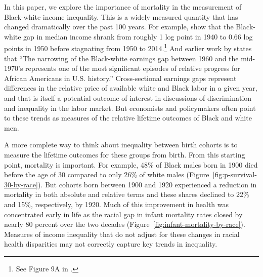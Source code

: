 \documentclass[12pt]{article}
\begin{document}

In this paper, we explore the importance of mortality in the measurement of Black-white income inequality. 
This is a widely measured quantity that has changed dramatically over the past 100 years. 
For example,  show that the Black-white gap in median income shrank from roughly 1 log point in 1940 to 0.66 log points in 1950 before stagnating from 1950 to 2014.\footnote{See Figure 9A in .} 
And earlier work by  states that ``The narrowing of the Black-white earnings gap between 1960 and the mid-1970's represents one of the most significant episodes of relative progress for African Americans in U.S. history.'' 
Cross-sectional earnings gaps represent differences in the relative price of available white and Black labor in a given year, and that is itself a potential outcome of interest in discussions of discrimination and inequality in the labor market. 
But economists and policymakers often point to these trends as measures of the relative lifetime outcomes of Black and white men. 

A more complete way to think about inequality between birth cohorts is to measure the lifetime outcomes for these groups from birth. 
From this starting point, mortality is important.
For example, 48\% of Black males born in 1900 died before the age of 30 compared to only 26\% of white males (Figure~\ref{fig:p-survival-30-by-race}). 
But cohorts born between 1900 and 1920 experienced a reduction in mortality in both absolute and relative terms and these shares declined to 22\% and 15\%, respectively, by 1920. 
Much of this improvement in health was concentrated early in life as the racial gap in infant mortality rates closed by nearly 80 percent over the two decades (Figure~\ref{fig:infant-mortality-by-race}). 
Measures of income inequality that do not adjust for these changes in racial health disparities may not correctly capture key trends in inequality. 

\end{document}
